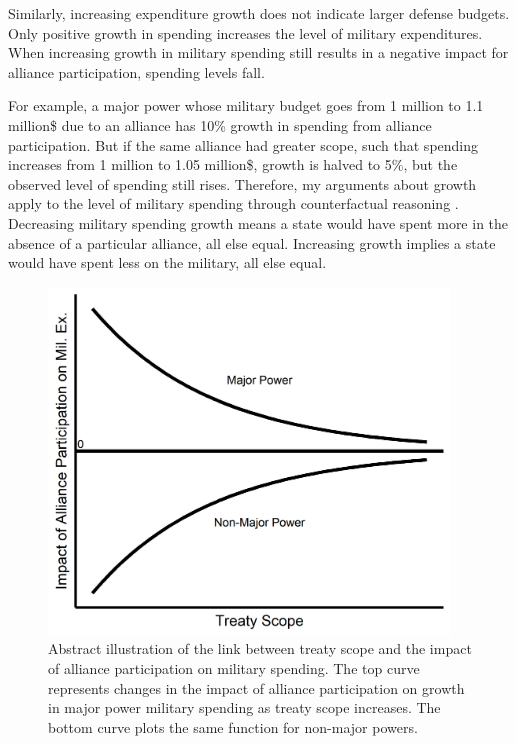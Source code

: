\documentclass[12pt]{article}
\begin{document}
Similarly, increasing expenditure growth does not indicate larger defense budgets. 
Only positive growth in spending increases the level of military expenditures. 
When increasing growth in military spending still results in a negative impact for alliance participation, spending levels fall. 


For example, a major power whose military budget goes from 1 million to 1.1 million\$ due to an alliance has 10\% growth in spending from alliance participation. 
But if the same alliance had greater scope, such that spending increases from 1 million to 1.05 million\$, growth is halved to 5\%, but the observed level of spending still rises. 
Therefore, my arguments about growth apply to the level of military spending through counterfactual reasoning \citep{Fearon1991}. 
Decreasing military spending growth means a state would have spent more in the absence of a particular alliance, all else equal. 
Increasing growth implies a state would have spent less on the military, all else equal.


\begin{figure}[htbp]
	\centering
		\includegraphics[width=0.95\textwidth]{../figures/illus-arg.png}
	\caption{Abstract illustration of the link between treaty scope and the impact of alliance participation on military spending.
	The top curve represents changes in the impact of alliance participation on growth in major power military spending as treaty scope increases.
	The bottom curve plots the same function for non-major powers.}
	\label{fig:illus-arg}
\end{figure}
\end{document}

